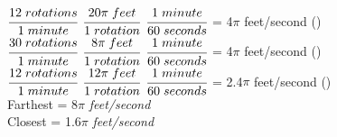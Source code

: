 \documentclass[letterpaper]{article}
\begin{document}
\begin{itemize}
       $\cfrac{12 \hspace{1mm}rotations}{1 \hspace{1mm} minute}$ \times \hspace{1mm} $\cfrac{20\pi \hspace{1mm}feet}{1 \hspace{1mm}rotation}$ \times \hspace{1mm} $\cfrac{1 \hspace{1mm}minute}{60 \hspace{1mm}seconds}$ = 4$\pi$ \hspace{1mm}feet/second \hspace{3mm} () \vspace{3mm}
       \\
       \newline
       $\cfrac{30 \hspace{1mm}rotations}{1 \hspace{1mm} minute}$ \times \hspace{1mm} $\cfrac{8\pi \hspace{1mm}feet}{1 \hspace{1mm}rotation}$ \times \hspace{1mm} $\cfrac{1 \hspace{1mm}minute}{60 \hspace{1mm}seconds}$ = 4$\pi$ \hspace{1mm}feet/second \hspace{3mm} () \vspace{3mm}
       \\
       \newline
       $\cfrac{12 \hspace{1mm}rotations}{1 \hspace{1mm} minute}$ \times \hspace{1mm} $\cfrac{12\pi \hspace{1mm}feet}{1 \hspace{1mm}rotation}$ \times \hspace{1mm} $\cfrac{1 \hspace{1mm}minute}{60 \hspace{1mm}seconds}$ = 2.4$\pi$ \hspace{1mm}feet/second \hspace{3mm} () \vspace{6mm}
       \\
       \newline
       Farthest = 8$\pi$ \hspace{1mm}\emph{feet/second} 
       \\
       \newline
       Closest = 1.6$\pi$ \hspace{1mm}\emph{feet/second} 
       \\

\end{itemize} \vspace{3mm}
\end{document}
